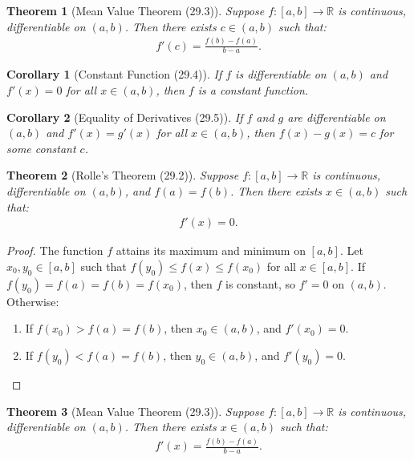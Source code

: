 \documentclass[7pt]{article}
\theoremstyle{definition}
\theoremstyle{plain}
\newtheorem{theorem}{Theorem}
\newtheorem{corollary}{Corollary}
\begin{document}
\begin{theorem}[Mean Value Theorem (29.3)]
Suppose $ f : [a, b] \to \mathbb{R} $ is continuous, differentiable on $ (a, b) $. Then there exists $ c \in (a, b) $ such that:
\begin{align}
f'(c) = \frac{f(b) - f(a)}{b - a}.
\end{align}
\end{theorem}

\begin{corollary}[Constant Function (29.4)]
If $ f $ is differentiable on $ (a, b) $ and $ f'(x) = 0 $ for all $ x \in (a, b) $, then $ f $ is a constant function.
\end{corollary}

\begin{corollary}[Equality of Derivatives (29.5)]
If $ f $ and $ g $ are differentiable on $ (a, b) $ and $ f'(x) = g'(x) $ for all $ x \in (a, b) $, then $ f(x) - g(x) = c $ for some constant $ c $.
\end{corollary}

\begin{theorem}[Rolle’s Theorem (29.2)]
Suppose $ f : [a, b] \to \mathbb{R} $ is continuous, differentiable on $ (a, b) $, and $ f(a) = f(b) $. Then there exists $ x \in (a, b) $ such that:
\begin{align}
f'(x) = 0.
\end{align}
\end{theorem}

\begin{proof}
The function $ f $ attains its maximum and minimum on $ [a, b] $. Let $ x_0, y_0 \in [a, b] $ such that $ f(y_0) \leq f(x) \leq f(x_0) $ for all $ x \in [a, b] $. If $ f(y_0) = f(a) = f(b) = f(x_0) $, then $ f $ is constant, so $ f' = 0 $ on $ (a, b) $. Otherwise:
\begin{enumerate}
    \item If $ f(x_0) > f(a) = f(b) $, then $ x_0 \in (a, b) $, and $ f'(x_0) = 0 $.
    \item If $ f(y_0) < f(a) = f(b) $, then $ y_0 \in (a, b) $, and $ f'(y_0) = 0 $.
\end{enumerate}
\end{proof}

\begin{theorem}[Mean Value Theorem (29.3)]
Suppose $ f : [a, b] \to \mathbb{R} $ is continuous, differentiable on $ (a, b) $. Then there exists $ x \in (a, b) $ such that:
\begin{align}
f'(x) = \frac{f(b) - f(a)}{b - a}.
\end{align}
\end{theorem}
\end{document}
